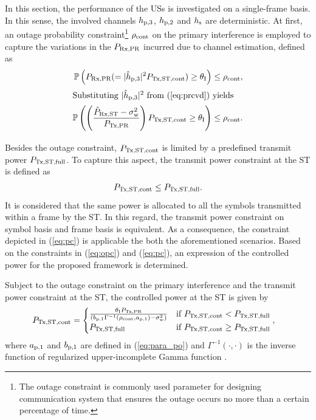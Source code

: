 In this section, the performance of the USs is investigated on a single-frame basis. In this sense, the involved channels $h_{\text{p,3}}$, $h_{\text{p,2}}$ and $h_{\text{s}}$ are deterministic.   
At first, an outage probability constraint\footnote{The outage constraint is commonly used parameter for designing communication system that ensures the outage occurs no more than a certain percentage of time.} $\rho_{\text{cont}}$ on the primary interference is employed to capture the variations in the $P_{\text{Rx,PR}}$ incurred due to channel estimation, defined as 
\begin{align}
\mathbb P\left( P_{\text{Rx,PR}} (= |\hat{h}_{\text{p,3}}|^2 P_{\text{Tx,ST,cont}}) \ge \theta_{\text{I}} \right) \le \rho_{\text{cont}}, \nonumber \\
\intertext{Substituting $|\hat{h}_{\text{p,3}}|^2$ from (\ref{eq:prcvd}) yields}
\mathbb P\left( \left( \frac{\hat{P}_{\text{Rx,ST}} - \sigma^2_{\text{w}}}{P_{\text{Tx,PR}}}\right) P_{\text{Tx,ST,cont}} \ge \theta_{\text{I}} \right) \le \rho_{\text{cont}}. \label{eq:opc} \\[-1em] \nonumber 
\end{align}
Besides the outage constraint, $P_{\text{Tx,ST,cont}}$ is limited by a predefined transmit power $P_{\text{Tx,ST,full}}$. To capture this aspect, the transmit power constraint at the ST is defined as
\begin{align}
P_{\text{Tx,ST,cont}} \le P_{\text{Tx,ST,full}}. \label{eq:pc} 
\end{align} 
It is considered that the same power is allocated to all the symbols transmitted within a frame by the ST. In this regard, the transmit power constraint on symbol basis and frame basis is equivalent. As a consequence, the constraint depicted in (\ref{eq:pc}) is applicable the both the aforementioned scenarios. Based on the constraints in (\ref{eq:opc}) and (\ref{eq:pc}), an expression of the controlled power for the proposed framework is determined.
\begin{lemma} \label{lm:lm4}
\normalfont 
Subject to the outage constraint on the primary interference and the transmit power constraint at the ST, the controlled power at the ST is given by
\begin{align}
P_{\text{Tx,ST,cont}} &= 
\begin{cases} 
\frac{\theta_{\text{I}} P_{\text{Tx,PR}}}{ \left(b_{\text{p,1}} \Gamma^{-1}(\rho_{\text{cont}}, a_{\text{p,1}}) - \sigma^2_{\text{w}}  \right)} & \mbox{if } P_{\text{Tx,ST,cont}} < P_{\text{Tx,ST,full}} \\
P_{\text{Tx,ST,full}} & \mbox{if } P_{\text{Tx,ST,cont}} \ge P_{\text{Tx,ST,full}}
\end{cases},
\label{eq:preg} 
\end{align}
where $a_{\text{p,1}}$ and $b_{\text{p,1}}$ are defined in (\ref{eq:para_po}) and $\Gamma^{-1}(\cdot, \cdot)$ is the inverse function of regularized upper-incomplete Gamma function \cite{abramo}.
\end{lemma} 
